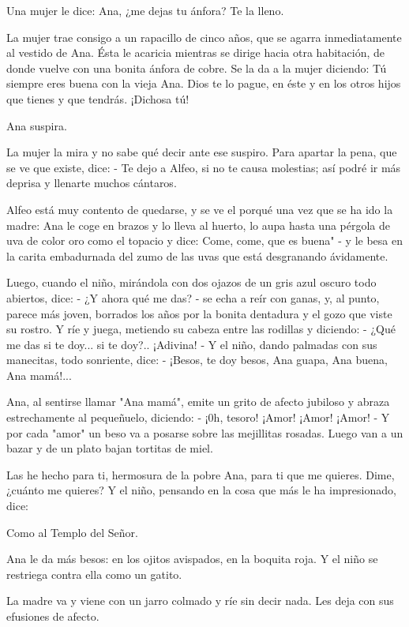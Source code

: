 \documentclass[12pt]{book} %
\begin{document}
Una mujer le dice: Ana, ¿me dejas tu ánfora? Te la lleno. 

La mujer trae consigo a un rapacillo de cinco años, que se agarra inmediatamente al vestido de Ana. Ésta le acaricia mientras se dirige hacia otra habitación, de donde vuelve con una bonita ánfora de cobre. Se la da a la mujer diciendo: Tú siempre eres buena con la vieja Ana. Dios te lo pague, en éste y en los otros hijos que tienes y que tendrás. ¡Dichosa tú!

Ana suspira. 

La mujer la mira y no sabe qué decir ante ese suspiro. Para apartar la pena, que se ve que existe, dice: - Te dejo a Alfeo, si no te causa molestias; así podré ir más deprisa y llenarte muchos cántaros. 

Alfeo está muy contento de quedarse, y se ve el porqué una vez que se ha ido la madre: Ana le coge en brazos y lo lleva al huerto, lo aupa hasta una pérgola de uva de color oro como el topacio y dice: Come, come, que es buena" - y le besa en la carita embadurnada del zumo de las uvas que está desgranando ávidamente. 

Luego, cuando el niño, mirándola con dos ojazos de un gris azul oscuro todo abiertos, dice: 
- ¿Y ahora qué me das? - se echa a reír con ganas, y, al punto, parece más joven, borrados los años por la bonita dentadura y el gozo que viste su rostro. Y ríe y juega, metiendo su cabeza entre las rodillas y diciendo: 
- ¿Qué me das si te doy... si te doy?.. ¡Adivina! - Y el niño, dando palmadas con sus manecitas, todo sonriente, dice: 
- ¡Besos, te doy besos, Ana guapa, Ana buena, Ana mamá!... 

Ana, al sentirse llamar "Ana mamá", emite un grito de afecto jubiloso y abraza estrechamente al pequeñuelo, diciendo: - ¡0h, tesoro! ¡Amor! ¡Amor! ¡Amor! - Y por cada "amor" un beso va a posarse sobre las mejillitas rosadas. 
Luego van a un bazar y de un plato bajan tortitas de miel. 

Las he hecho para ti, hermosura de la pobre Ana, para ti que me quieres. Dime, ¿cuánto me quieres? Y el niño, pensando en la cosa que más le ha impresionado, dice: 

Como al Templo del Señor. 

Ana le da más besos: en los ojitos avispados, en la boquita roja. Y el niño se restriega contra ella como un gatito. 

La madre va y viene con un jarro colmado y ríe sin decir nada. Les deja con sus efusiones de afecto. 
\end{document}
